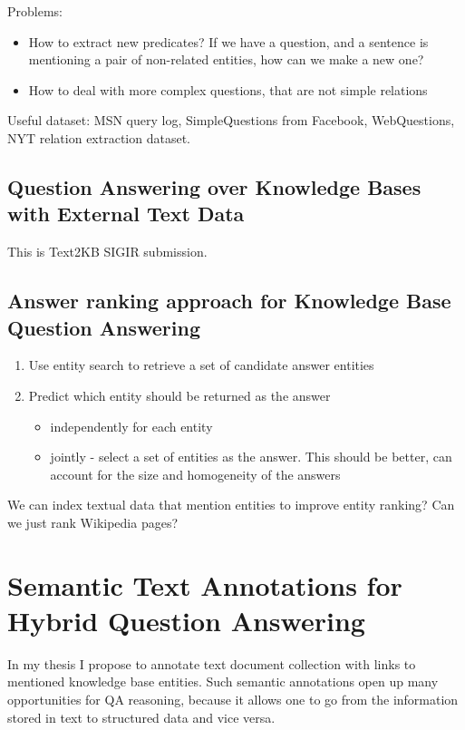 Problems:
\begin{itemize}
\item How to extract new predicates? If we have a question, and a sentence is mentioning a pair of non-related entities, how can we make a new one?
\item How to deal with more complex questions, that are not simple relations
\end{itemize}

Useful dataset: MSN query log, SimpleQuestions from Facebook, WebQuestions, NYT relation extraction dataset.

\subsection{Question Answering over Knowledge Bases with External Text Data}
This is Text2KB SIGIR submission.

\subsection{Answer ranking approach for Knowledge Base Question Answering}

\begin{enumerate}
\item Use entity search to retrieve a set of candidate answer entities
\item Predict which entity should be returned as the answer
    \begin{itemize}
    \item independently for each entity
    \item jointly - select a set of entities as the answer. This should be better, can account for the size and homogeneity of the answers
    \end{itemize}
\end{enumerate}

We can index textual data that mention entities to improve entity ranking? Can we just rank Wikipedia pages?

\section{Semantic Text Annotations for Hybrid Question Answering}

In my thesis I propose to annotate text document collection with links to mentioned knowledge base entities.
Such semantic annotations open up many opportunities for QA reasoning, because it allows one to go from the information stored in text to structured data and vice versa.


